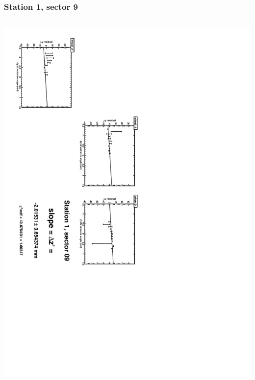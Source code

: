 \documentclass[compress]{beamer}
\begin{document}
\begin{frame}
\frametitle{Station 1, sector 9}
\begin{columns}
\includegraphics[height=\linewidth, angle=90]{zfits/zfit_1_09.pdf}


\end{columns}
\end{frame}
\end{document}
